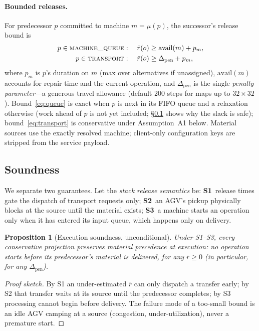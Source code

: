 \documentclass[twocolumn]{article}
\newtheorem{proposition}{Proposition}
\begin{document}
\paragraph{Bounded releases.}
For predecessor $p$ committed to machine $m=\mu(p)$, the successor's
release bound is
\begin{align}
p\in\textsc{machine\_queue}:\quad
\bar r(o) &\ge \mathrm{avail}(m) + p_m, \label{eq:queue}\\
p\in\textsc{transport}:\quad
\bar r(o) &\ge \Delta_{\mathrm{pen}} + p_m, \label{eq:transport}
\end{align}
where $p_m$ is $p$'s duration on $m$ (max over alternatives if
unassigned), $\mathrm{avail}(m)$ accounts for repair time and the
current operation, and $\Delta_{\mathrm{pen}}$ is the single
\emph{penalty parameter}---a generous travel allowance (default 200
steps for maps up to $32{\times}32$). Bound~\eqref{eq:queue} is exact
when $p$ is next in its FIFO queue and a relaxation otherwise
(work ahead of $p$ is not yet included; \S\ref{sec:sound} shows why the
slack is safe); bound~\eqref{eq:transport} is conservative under
Assumption~A1 below. Material sources use the exactly resolved machine;
client-only configuration keys are stripped from the service payload.

\subsection{Soundness}
\label{sec:sound}
We separate two guarantees. Let the \emph{stack release semantics} be:
\textbf{S1}~release times gate the dispatch of transport requests only;
\textbf{S2}~an AGV's pickup physically blocks at the source until the
material exists; \textbf{S3}~a machine starts an operation only when it
has entered its input queue, which happens only on delivery.

\begin{proposition}[Execution soundness, unconditional]
\label{prop:exec}
Under S1--S3, every conservative projection preserves material
precedence at execution: no operation starts before its predecessor's
material is delivered, for \emph{any} $\bar r\ge 0$ (in particular, for
any $\Delta_{\mathrm{pen}}$).
\end{proposition}
\begin{proof}[Proof sketch]
By S1 an under-estimated $\bar r$ can only dispatch a transfer early;
by S2 that transfer waits at its source until the predecessor
completes; by S3 processing cannot begin before delivery. The failure
mode of a too-small bound is an idle AGV camping at a source
(congestion, under-utilization), never a premature start.
\end{proof}
\end{document}
